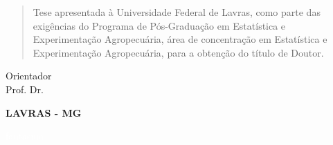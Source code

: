 \newpage
\vspace{-0.7cm}
\centerline{\textbf{\teseauthorcap}}
\vspace{1.4cm}
\begin{singlespace}
\begin{center}
\textbf{\tesetitlecap}
\end{center}
\end{singlespace}
\vspace{1cm}
\begin{flushright}
\begin{minipage}{9.6cm}
\begin{quote}
\begin{singlespace}
Tese apresentada à Universidade Federal de Lavras, como parte das 
exigências do Programa de Pós-Graduação em Estatística e 
Experimentação Agropecuária, área de concentração em Estatística e 
Experimentação Agropecuária, para a obtenção do título de Doutor.
\end{singlespace}
\end{quote}
\end{minipage}
\end{flushright}
\vspace{1.1cm}

\begin{center}
\begin{singlespace}
\noindent Orientador\\
\noindent Prof. Dr. \teseorientador

\vfill

\Large{\textbf{LAVRAS - MG\\ \teseyear}}
\end{singlespace}
\end{center}


\newpage
\textcolor{white}{fantasma}

